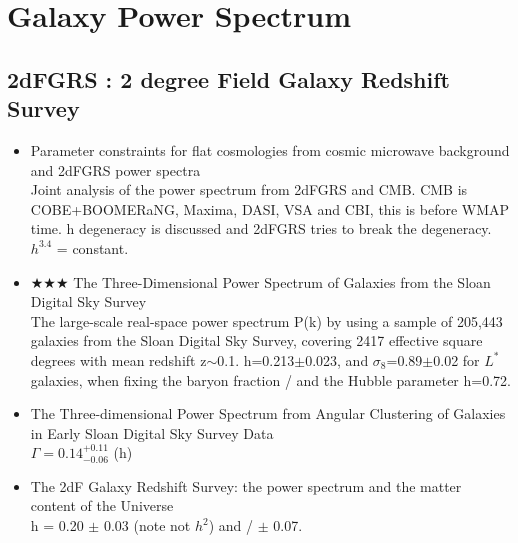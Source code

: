 \section{Galaxy Power Spectrum}

\subsection{2dFGRS : 2 degree Field Galaxy Redshift Survey}
\begin{itemize}
\item Parameter constraints for flat cosmologies from cosmic microwave background and 2dFGRS power spectra \citep[][percival02a, \#217 4/21/10]{percival02a}\\
Joint analysis of the power spectrum from 2dFGRS and CMB.
CMB is COBE+BOOMERaNG, Maxima, DASI, VSA and CBI, this is before WMAP time.
\omegam h degeneracy is discussed and 2dFGRS tries to break the degeneracy.
\omegam $h^{3.4}$ = constant.

\item $\bigstar\bigstar\bigstar$ The Three-Dimensional Power Spectrum of Galaxies 
from the Sloan Digital Sky Survey 
\citep[][\#779, 5/3/10, tegmark04a]{tegmark04a}\\
The large-scale real-space power spectrum P(k) by using a sample of 205,443 galaxies from the Sloan Digital Sky Survey, covering 2417 effective square degrees with mean redshift z$\sim$0.1.
\omegam h=0.213$\pm$0.023, and $\sigma_{8}$=0.89$\pm$0.02 for $L^{*}$ galaxies, 
when fixing the baryon fraction \omegam /  and the Hubble parameter h=0.72.

\item The Three-dimensional Power Spectrum from Angular Clustering of Galaxies in 
Early Sloan Digital Sky Survey Data \citep[][dodelson02a, \#114 4/21/10]{dodelson02a}\\
$\Gamma=0.14 ^{+0.11} _{-0.06}$ (\omegam h)
\item The 2dF Galaxy Redshift Survey: the power spectrum and the matter content of the Universe \citep[][]{percival01a}\\
\omegam h = 0.20 $\pm$ 0.03 (note not $h^{2}$) and 
\omegam /  $\pm$ 0.07.

\end{itemize}
